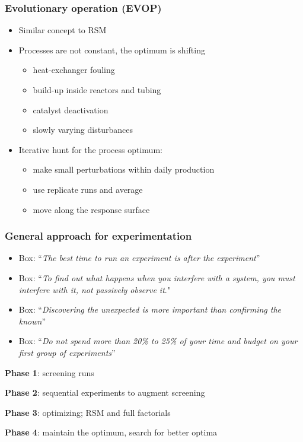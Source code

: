 \begin{frame}\frametitle{Evolutionary operation (EVOP)}
	\begin{itemize}
		\item	Similar concept to RSM
		\item	Processes are not constant, the optimum is shifting
		\begin{itemize}
			\item	heat-exchanger fouling
			\item	build-up inside reactors and tubing
			\item	catalyst deactivation
			\item	slowly varying disturbances
		\end{itemize}
	\end{itemize}
	\begin{itemize}
		\item	Iterative hunt for the process optimum:
		\begin{itemize}
			\item	make small perturbations within daily production
			\item	use replicate runs and average
			\item	move along the response surface
		\end{itemize}
	\end{itemize}
\end{frame}

\begin{frame}\frametitle{General approach for experimentation}
	\begin{itemize}
		\item	Box: ``\emph{The best time to run an experiment is after the experiment}''
		\item	Box: ``\emph{To find out what happens when you interfere with a system, you must interfere with it, not passively observe it}." 
		\item	Box: ``\emph{Discovering the unexpected is more important than confirming the known}''
		\item	Box: ``\emph{Do not spend more than 20\% to 25\% of your time and budget on your first group of experiments}''
	\end{itemize}

	\textbf{Phase 1}: screening runs

	\textbf{Phase 2}: sequential experiments to augment screening

	\textbf{Phase 3}: optimizing; RSM and full factorials

	\textbf{Phase 4}: maintain the optimum, search for better optima
\end{frame}

